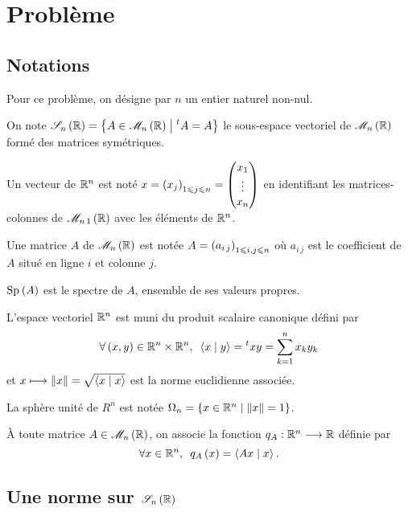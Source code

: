 \section*{Problème}

\subsection*{Notations}

Pour ce problème, on désigne par \(n\) un entier naturel non-nul.

On note \(\sym{n}[\R]=\accol{A\in\M{n}[\R]\tq\trans{A}=A}\) le sous-espace vectoriel de \(\M{n}[\R]\) formé des matrices symétriques.

Un vecteur de \(\mathbb{R}^n\) est noté \(x=\left(x_j\right)_{1\leqslant j\leqslant n}=\begin{pmatrix}x_1\\\vdots\\x_n\end{pmatrix}\) en identifiant les matrices-colonnes de \(\M{n\,1}[\R]\) avec les éléments de \(\mathbb{R}^n\).

Une matrice \(A\) de \(\M{n}[\R]\) est notée \(A=\left(a_{i\,j}\right)_{1\leqslant i,j\leqslant n}\) où \(a_{i\,j}\) est le coefficient de \(A\) situé en ligne \(i\) et colonne \(j\).

\(\Sp{A}\) est le spectre de \(A\), ensemble de ses valeurs propres.

L'espace vectoriel \(\mathbb{R}^n\) est muni du produit scalaire canonique défini par \[\quantifs{\forall\paren{x,y}\in\R^n\times\R^n}\ps{x}{y}=\trans{x}y=\sum_{k=1}^nx_ky_k\] et \(x\mapsto\norme{x}=\sqrt{\ps{x}{x}}\) est la norme euclidienne associée.

La sphère unité de \(R^n\) est notée \(\Omega_n=\accol{x\in\R^n\tq\norme{x}=1}\).

À toute matrice \(A\in\M{n}[\R]\), on associe la fonction \(q_A:\mathbb{R}^n\longrightarrow\mathbb{R}\) définie par \[\quantifs{\forall x\in\R^n}q_A\paren{x}=\ps{Ax}{x}.\]

\subsection*{Une norme sur \(\sym{n}[\R]\)}

\setcounter{q}{0}

